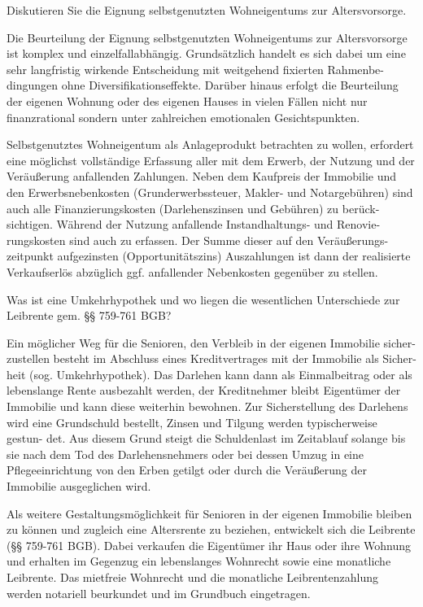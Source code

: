 Diskutieren Sie die Eignung selbstgenutzten Wohneigentums zur Altersvorsorge.

Die Beurteilung der Eignung selbstgenutzten Wohneigentums zur Altersvorsorge ist komplex und einzelfallabhängig. 
Grundsätzlich handelt es sich dabei um
eine sehr langfristig wirkende Entscheidung mit weitgehend fixierten Rahmenbe-
dingungen ohne Diversifikationseffekte. Darüber hinaus erfolgt die Beurteilung der
eigenen Wohnung oder des eigenen Hauses in vielen Fällen nicht nur finanzrational
sondern unter zahlreichen emotionalen Gesichtspunkten.

Selbstgenutztes Wohneigentum als Anlageprodukt betrachten zu wollen, erfordert
eine möglichst vollständige Erfassung aller mit dem Erwerb, der Nutzung und der
Veräußerung anfallenden Zahlungen. Neben dem Kaufpreis der Immobilie und
den Erwerbsnebenkosten (Grunderwerbssteuer, Makler- und Notargebühren)
sind auch alle Finanzierungskosten (Darlehenszinsen und Gebühren) zu berück-
sichtigen. Während der Nutzung anfallende Instandhaltungs- und Renovie-
rungskosten sind auch zu erfassen. Der Summe dieser auf den Veräußerungs-
zeitpunkt aufgezinsten (Opportunitätszins) Auszahlungen ist dann der realisierte
Verkaufserlös abzüglich ggf. anfallender Nebenkosten gegenüber zu stellen.


Was ist eine Umkehrhypothek und wo liegen die wesentlichen Unterschiede zur Leibrente gem. §§ 759-761 BGB?

Ein möglicher Weg für die Senioren, den Verbleib in der eigenen Immobilie sicher-
zustellen besteht im Abschluss eines Kreditvertrages mit der Immobilie als Sicher-
heit (sog. Umkehrhypothek). Das Darlehen kann dann als Einmalbeitrag oder als
lebenslange Rente ausbezahlt werden, der Kreditnehmer bleibt Eigentümer der
Immobilie und kann diese weiterhin bewohnen. Zur Sicherstellung des Darlehens
wird eine Grundschuld bestellt, Zinsen und Tilgung werden typischerweise gestun-
det. Aus diesem Grund steigt die Schuldenlast im Zeitablauf solange bis sie nach
dem Tod des Darlehensnehmers oder bei dessen Umzug in eine Pflegeeinrichtung
von den Erben getilgt oder durch die Veräußerung der Immobilie ausgeglichen
wird.


Als weitere Gestaltungsmöglichkeit für Senioren in der eigenen Immobilie bleiben
zu können und zugleich eine Altersrente zu beziehen, entwickelt sich die Leibrente
(§§ 759-761 BGB). Dabei verkaufen die Eigentümer ihr Haus oder ihre Wohnung
und erhalten im Gegenzug ein lebenslanges Wohnrecht sowie eine monatliche
Leibrente.
Das mietfreie Wohnrecht und die monatliche Leibrentenzahlung werden
notariell beurkundet und im Grundbuch eingetragen.


